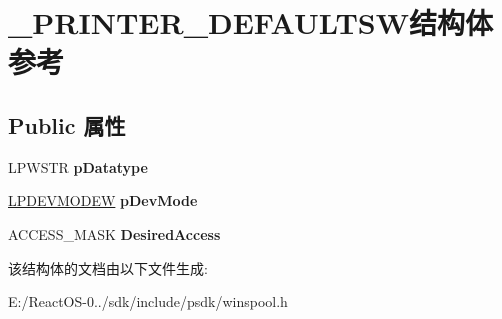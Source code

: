 \hypertarget{struct___p_r_i_n_t_e_r___d_e_f_a_u_l_t_s_w}{}\section{\+\_\+\+P\+R\+I\+N\+T\+E\+R\+\_\+\+D\+E\+F\+A\+U\+L\+T\+S\+W结构体 参考}
\label{struct___p_r_i_n_t_e_r___d_e_f_a_u_l_t_s_w}
\subsection*{Public 属性}
\begin{DoxyCompactItemize}
\item 
\mbox{\label{struct___p_r_i_n_t_e_r___d_e_f_a_u_l_t_s_w_a8428668d4724a0e7373b54d8a3dae7ed}} 
L\+P\+W\+S\+TR {\bfseries p\+Datatype}
\item 
\mbox{\label{struct___p_r_i_n_t_e_r___d_e_f_a_u_l_t_s_w_a44d5ad122bbe16df1cf8a47ca67cb6a7}} 
\hyperlink{struct__devicemode_w}{L\+P\+D\+E\+V\+M\+O\+D\+EW} {\bfseries p\+Dev\+Mode}
\item 
\mbox{\label{struct___p_r_i_n_t_e_r___d_e_f_a_u_l_t_s_w_a787653fbd5adaddf6df3cbf91256c50c}} 
A\+C\+C\+E\+S\+S\+\_\+\+M\+A\+SK {\bfseries Desired\+Access}
\end{DoxyCompactItemize}


该结构体的文档由以下文件生成\+:\begin{DoxyCompactItemize}
\item 
E\+:/\+React\+O\+S-\/0../sdk/include/psdk/winspool.\+h\end{DoxyCompactItemize}
